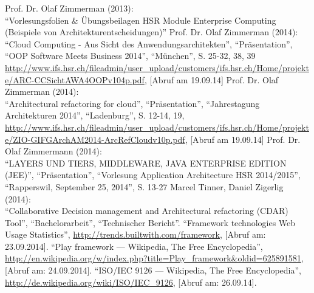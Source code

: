 \begin{thebibliography}{literatur}
	 Prof. Dr. Olaf Zimmerman (2013): \\
		"`Vorlesungsfolien \& Übungsbeilagen HSR Module Enterprise Computing (Beispiele von Architekturentscheidungen)"'
	 Prof. Dr. Olaf Zimmerman (2014): \\
		"`Cloud Computing - Aus Sicht des Anwendungsarchitekten"', "`Präsentation"', "`OOP Software Meets Business 2014"', "`München"', S. 25-32, 38, 39
		\url{http://www.ifs.hsr.ch/fileadmin/user\_upload/customers/ifs.hsr.ch/Home/projekte/ARC-CCSichtAWA4OOPv104p.pdf}, 
		[Abruf am 19.09.14]
	 Prof. Dr. Olaf Zimmerman (2014): \\
		"`Architectural refactoring for cloud"', "`Präsentation"', "`Jahrestagung Architekturen 2014"', "`Ladenburg"', S. 12-14, 19,
		\url{http://www.ifs.hsr.ch/fileadmin/user\_upload/customers/ifs.hsr.ch/Home/projekte/ZIO-GIFGArchAM2014-ArcRefCloudv10p.pdf}, 
		[Abruf am 19.09.14]
	 Prof. Dr. Olaf Zimmermann (2014): \\
		"`LAYERS UND TIERS, MIDDLEWARE, JAVA ENTERPRISE EDITION (JEE)"', "`Präsentation"', "`Vorlesung Application Architecture HSR 2014/2015"', "`Rapperswil, September 25, 2014"', S. 13-27
	 Marcel Tinner, Daniel Zigerlig (2014): \\
		"`Collaborative Decision management and Architectural refactoring (CDAR) Tool"', "`Bachelorarbeit"', "`Technischer Bericht"'.
	 "`Framework technologies Web Usage Statistics"',
		\url{http://trends.builtwith.com/framework}, [Abruf am: 23.09.2014].
	 "`Play framework --- Wikipedia{,} The Free Encyclopedia"',
		\url{http://en.wikipedia.org/w/index.php?title=Play_framework&oldid=625891581}, [Abruf am: 24.09.2014].
	 "`ISO/IEC 9126 --- Wikipedia{,} The Free Encyclopedia"',
		\url{http://de.wikipedia.org/wiki/ISO/IEC_9126}, [Abruf am: 26.09.14].

\end{thebibliography}
